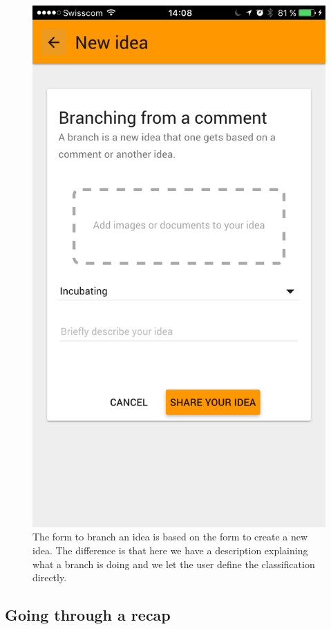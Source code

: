 \documentclass[a4paper,12pt,twoside]{article}
\begin{document}
\begin{figure}[!htb]
\begin{minipage}[t]{.32\textwidth}
        \includegraphics[width=\textwidth]{images/flow_branch_2.png}
        \caption{The form to branch an idea is based on the form to create a new idea. The difference is that here we have a description explaining what a branch is doing and we let the user define the classification directly.}
    \end{minipage}
\end{figure}

\clearpage
\subsection{Going through a recap}
\end{document}
